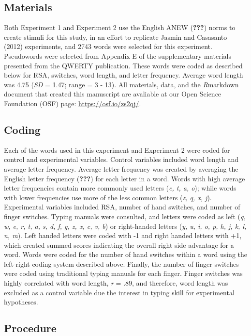 \documentclass[english,man]{apa6}
\theoremstyle{definition}
\theoremstyle{definition}
\theoremstyle{definition}
\theoremstyle{remark}
\begin{document}
\subsection{Materials}\label{materials}

Both Experiment 1 and Experiment 2 use the English ANEW ({\textbf{???}})
norms to create stimuli for this study, in an effort to replicate Jasmin
and Casasanto (2012) experiments, and 2743 words were selected for this
experiment. Pseudowords were selected from Appendix E of the
supplementary materials presented from the QWERTY publication. These
words were coded as described below for RSA, switches, word length, and
letter frequency. Average word length was 4.75 (\emph{SD} = 1.47; range
= 3 - 13). All materials, data, and the \emph{R}markdown document that
created this manuscript are avaliable at our Open Science Foundation
(OSF) page: \url{https://osf.io/zs2qj/}.

\subsection{Coding}\label{coding}

Each of the words used in this experiment and Experiment 2 were coded
for control and experimental variables. Control variables included word
length and average letter frequency. Average letter frequency was
created by averaging the English letter frequency ({\textbf{???}}) for
each letter in a word. Words with high average letter frequencies
contain more commonly used letters (\emph{e, t, a, o}); while words with
lower frequencies use more of the less common letters (\emph{z, q, x,
j}). Experimental variables included RSA, number of hand switches, and
number of finger switches. Typing manuals were consulted, and letters
were coded as left (\emph{q, w, e, r, t, a, s, d, f, g, z, x, c, v, b})
or right-handed letters (\emph{y, u, i, o, p, h, j, k, l, n, m}). Left
handed letters were coded with -1 and right handed letters with +1,
which created summed scores indicating the overall right side advantage
for a word. Words were coded for the number of hand switches within a
word using the left-right coding system described above. Finally, the
number of finger switches were coded using traditional typing manuals
for each finger. Finger switches was highly correlated with word length,
\emph{r} = .89, and therefore, word length was excluded as a control
variable due the interest in typing skill for experimental hypotheses.

\subsection{Procedure}\label{procedure}
\end{document}
